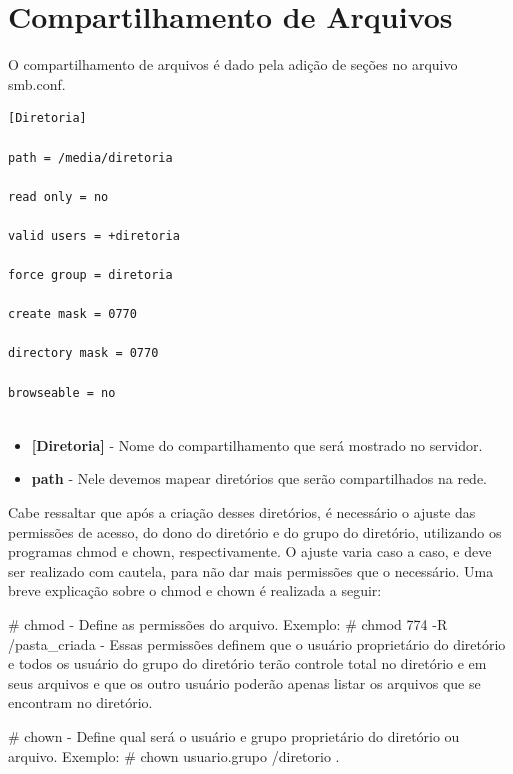 \section{Compartilhamento de Arquivos}

O compartilhamento de arquivos é dado pela adição de seções no arquivo smb.conf.\\

\begin{lstlisting}	
[Diretoria]

path = /media/diretoria

read only = no

valid users = +diretoria

force group = diretoria

create mask = 0770

directory mask = 0770

browseable = no
	
\end{lstlisting}

\begin{itemize}
	\item \textbf{[Diretoria]} - Nome do compartilhamento que será mostrado no servidor.
	\item \textbf{path} - Nele devemos mapear diretórios que serão compartilhados na rede. 
\end{itemize}

	Cabe ressaltar que após a criação desses diretórios, é necessário o ajuste das permissões de acesso, do dono do diretório e do grupo do diretório, utilizando os programas chmod e chown, respectivamente. O ajuste varia caso a caso, e deve ser realizado com cautela, para não dar mais permissões que o necessário. Uma breve explicação sobre o chmod e chown é realizada a seguir:

\# chmod - Define as permissões do arquivo. Exemplo: \# chmod 774 -R /pasta\_criada - Essas permissões definem que o usuário proprietário do diretório e todos os usuário do grupo do diretório terão controle total no diretório e em seus arquivos e que os outro usuário poderão apenas listar os arquivos que se encontram no diretório.

\# chown - Define qual será o usuário e grupo proprietário do diretório ou arquivo. Exemplo: \# chown usuario.grupo /diretorio .


